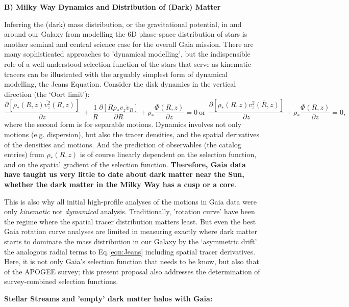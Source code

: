 \noindent\textbf{B) Milky Way Dynamics and Distribution of (Dark) Matter}

Inferring the (dark) mass distribution, or the gravitational potential, in and around our Galaxy from modelling the 6D phase-space distribution of stars is another seminal and central science case for the overall Gaia mission. There are many sophisticated approaches to 'dynamical modelling', but the indispensible role of a well-understood selection function of the stars that serve as kinematic tracers can be illustrated with the arguably simplest form of dynamical modelling, the Jeans Equation. Consider the disk dynamics in the vertical direction (the `Oort limit'):
\begin{equation}
    \frac{\partial[\rho_*(R,z) \overline{v_z^2}(R,z)]}{\partial z}~+~\frac{1}{R}
    \frac{\partial[R \rho_* \overline{v_z v_R}]}{\partial R} + \rho_*\frac{\Phi(R,z)}{\partial z}=0 \mathrm{\ or\ \ } \frac{\partial[\rho_*(R,z) \overline{v_z^2(R,z)}]}{\partial z} + \rho_*\frac{\Phi(R,z)}{\partial z}=0,
    \label{eqn:Jeans}
\end{equation}
where the second form is for separable motions. Dynamics involves not only motions (e.g. dispersion), but also the tracer densities, and the spatial derivatives of the densities and motions. And the prediction of observables (the catalog entries) from $\rho_*(R,z)$ is of course linearly dependent on the selection function, and
on the spatial gradient of the selection function. \textbf{Therefore, Gaia data have taught us very little to date about dark matter near the Sun, whether the dark matter in the Milky Way has a cusp or a core}.

This is also why all initial high-profile analyses of the motions in Gaia data 
\citep{Katz2018a,Antoja2018a} were only \emph{kinematic} not \emph{dymamical} analysis. Traditionally, 'rotation curve' have been the regime where the spatial tracer distribution matters least. But even the best Gaia rotation curve analyses \citep[e.g.][]{Eilers2019a} are limited in measuring exactly where dark matter starts to dominate the mass distribution in our Galaxy by the `asymmetric drift' 
the analogous radial terms to Eq.\ref{eqn:Jeans} including spatial tracer derivatives. Here, it is not only Gaia's selection function that needs to be know, but also that of the APOGEE survey; this present proposal also addresses the determination of survey-combined selection functions.

\noindent\textbf{Stellar Streams and 'empty' dark matter halos with Gaia:\ }

